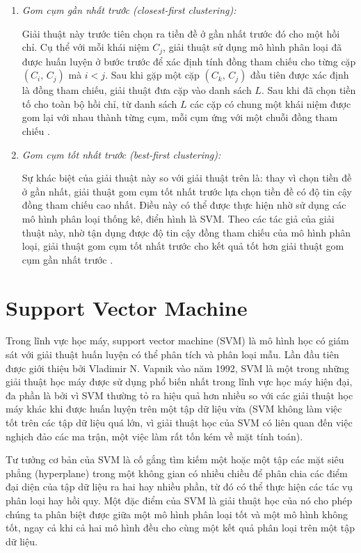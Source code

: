 \begin{enumerate}[parsep=0pt]
\item \emph{Gom cụm gần nhất trước (closest-first clustering):}

Giải thuật này trước tiên chọn ra tiền đề ở gần nhất trước đó cho một hồi chỉ. Cụ thể với mỗi khái niệm $C_j$, giải thuật sử dụng mô hình phân loại đã được huấn luyện ở bước trước để xác định tính đồng tham chiếu cho từng cặp $(C_i,\,C_j)$ mà $i<j$. Sau khi gặp một cặp $(C_k,\,C_j)$ đầu tiên được xác định là đồng tham chiếu, giải thuật đưa cặp vào danh sách $L$. Sau khi đã chọn tiền tố cho toàn bộ hồi chỉ, từ danh sách $L$ các cặp có chung một khái niệm được gom lại với nhau thành từng cụm, mỗi cụm ứng với một chuỗi đồng tham chiếu \cite{Soon2001}.
\item \emph{Gom cụm tốt nhất trước (best-first clustering):}

Sự khác biệt của giải thuật này so với giải thuật trên là: thay vì chọn tiền đề ở gần nhất, giải thuật gom cụm tốt nhất trước lựa chọn tiền đề có độ tin cậy đồng tham chiếu cao nhất. Điều này có thể được thực hiện nhờ sử dụng các mô hình phân loại thống kê, điển hình là SVM. Theo các tác giả của giải thuật này, nhờ tận dụng được độ tin cậy đồng tham chiếu của mô hình phân loại, giải thuật gom cụm tốt nhất trước cho kết quả tốt hơn giải thuật gom cụm gần nhất trước \cite{VincentNg2002a}.
\end{enumerate}

\section{Support Vector Machine}
Trong lĩnh vực học máy, support vector machine (SVM) là mô hình học có giám sát với giải thuật huấn luyện có thể phân tích và phân loại mẫu. Lần đầu tiên được giới thiệu bởi Vladimir N. Vapnik vào năm 1992, SVM là một trong những giải thuật học máy được sử dụng phổ biến nhất trong lĩnh vực học máy hiện đại, đa phần là bởi vì SVM thường tỏ ra hiệu quả hơn nhiều so với các giải thuật học máy khác khi được huấn luyện trên một tập dữ liệu vừa (SVM không làm việc tốt trên các tập dữ liệu quá lớn, vì giải thuật học của SVM có liên quan đến việc nghịch đảo các ma trận, một việc làm rất tốn kém về mặt tính toán). 

Tư tưởng cơ bản của SVM là cố gắng tìm kiếm một hoặc một tập các mặt siêu phẳng (hyperplane) trong một không gian có nhiều chiều để phân chia các điểm đại diện của tập dữ liệu ra hai hay nhiều phần, từ đó có thể thực hiện các tác vụ phân loại hay hồi quy. Một đặc điểm của SVM là giải thuật học của nó cho phép chúng ta phân biệt được giữa một mô hình phân loại tốt và một mô hình không tốt, ngay cả khi cả hai mô hình đều cho cùng một kết quả phân loại trên một tập dữ liệu.

